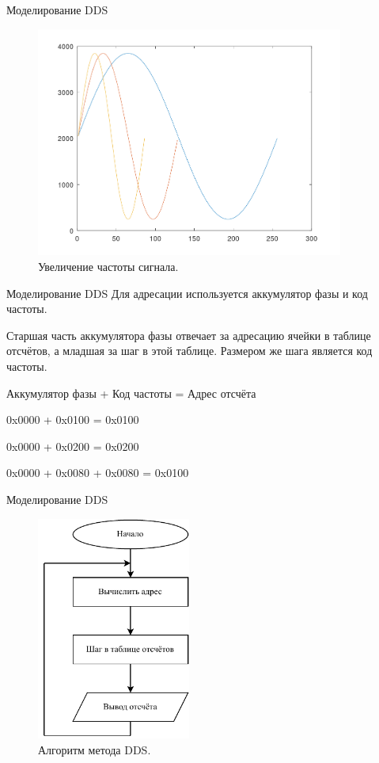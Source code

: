 \documentclass[10pt]{beamer}
\begin{document}
\begin{frame}{Моделирование DDS}
  \begin{figure}
  \includegraphics[width=0.9\textwidth]{tab_sin_s}
  \caption{Увеличение частоты сигнала.}
  \end{figure}
\end{frame}


\begin{frame}[containsverbatim]{Моделирование DDS}
	Для адресации используется аккумулятор фазы и код частоты. 
	
	Старшая часть аккумулятора фазы отвечает за адресацию ячейки в таблице отсчётов, а младшая за шаг в этой таблице. Размером же шага является код частоты.

	Аккумулятор фазы + Код частоты = Адрес отсчёта 
	
	0x0000 + 0x0100 = 0x0100

	0x0000 + 0x0200 = 0x0200
	
	0x0000 + 0x0080 + 0x0080 = 0x0100
		
\end{frame}

\begin{frame}{Моделирование DDS}
  \begin{figure}
  \includegraphics[width=0.45\textwidth]{dds_block}
  \caption{Алгоритм метода DDS.}
  \end{figure}
\end{frame}
\end{document}
